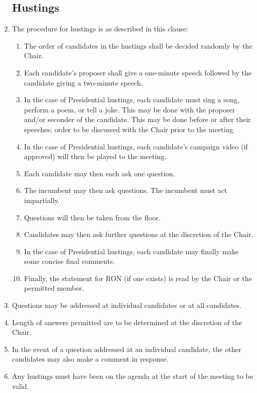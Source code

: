 \documentclass[12pt]{article}
\begin{document}
\begin{enumerate}
    \subsection{Hustings}
    \item The procedure for hustings is as described in this clause:
    \begin{enumerate}
        \item The order of candidates in the hustings shall be decided randomly by the Chair.
        \item Each candidate's proposer shall give a one-minute speech followed by the candidate giving a two-minute speech.
        \item In the case of Presidential hustings, each candidate must sing a song, perform a poem, or tell a joke. This may be done with the proposer and/or seconder of the candidate. This may be done before or after their speeches; order to be discussed with the Chair prior to the meeting.
        \item In the case of Presidential hustings, each candidate's campaign video (if approved) will then be played to the meeting.
        \item Each candidate may then each ask one question.
        \item The incumbent may then ask questions. The incumbent must act impartially.
        \item Questions will then be taken from the floor. 
        \item Candidates may then ask further questions at the discretion of the Chair.
        \item In the case of Presidential hustings, each candidate may finally make some concise final comments.
        \item Finally, the statement for RON (if one exists) is read by the Chair or the permitted member.
    \end{enumerate}
    \item Questions may be addressed at individual candidates or at all candidates.
    \item Length of answers permitted are to be determined at the discretion of the Chair.
    \item In the event of a question addressed at an individual candidate, the other candidates may also make a comment in response.
    \item Any hustings must have been on the agenda at the start of the meeting to be valid.

\end{enumerate}
\end{document}
